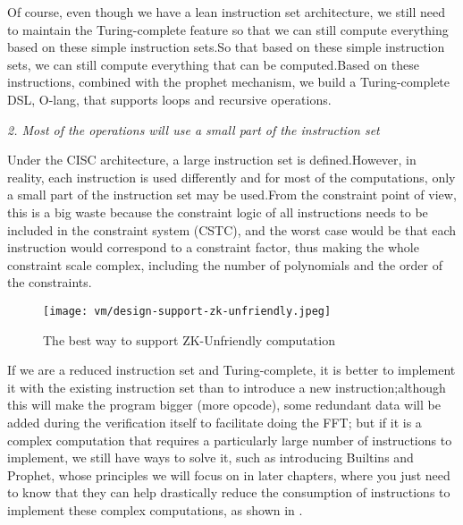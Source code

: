 Of course, even though we have a lean instruction set architecture, we still need to maintain the Turing-complete feature so that
we can still compute everything based on these simple instruction sets.So that based on these simple instruction sets, we can still
compute everything that can be computed.Based on these instructions, combined with the prophet mechanism, we build a Turing-complete
DSL, O-lang, that supports loops and recursive operations.

\emph{2. Most of the operations will use a small part of the instruction set}

Under the CISC architecture, a large instruction set is defined.However, in reality, each instruction is used differently and for most
of the computations, only a small part of the instruction set may be used.From the constraint point of view, this is a big waste because
the constraint logic of all instructions needs to be included in the constraint system (CSTC), and the worst case would be that each instruction
would correspond to a constraint factor, thus making the whole constraint scale complex, including the number of polynomials and the order of
the constraints.

\begin{figure}[!ht]
    \centering
    \texttt{[image: vm/design-support-zk-unfriendly.jpeg]}
    \caption{The best way to support ZK-Unfriendly computation}
    \label{fig:desgin-support-zk-unfriendly}
\end{figure}

If we are a reduced instruction set and Turing-complete, it is better to implement it with the existing instruction set than to introduce a new
instruction;although this will make the program bigger (more opcode), some redundant data will be added during the verification itself to
facilitate doing the FFT; but if it is a complex computation that requires a particularly large number of instructions to implement, we still
have ways to solve it, such as introducing Builtins and Prophet, whose principles we will focus on in later chapters, where you just need to
know that they can help drastically reduce the consumption of instructions to implement these complex computations, as shown in .